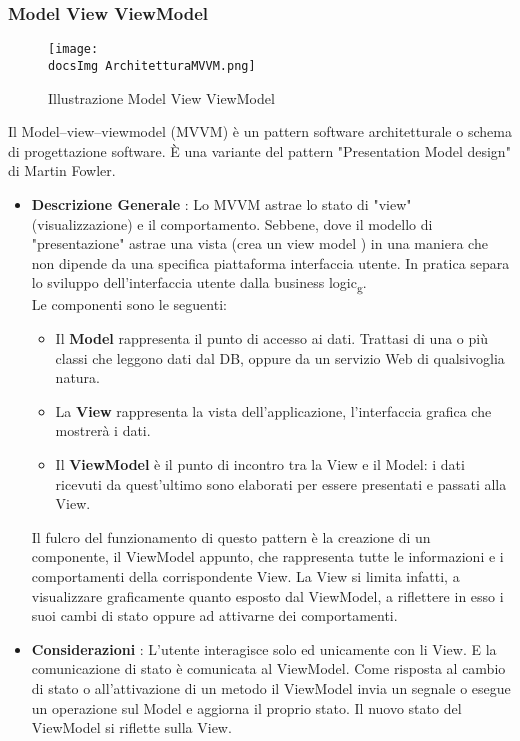{{		\subsubsection{Model View ViewModel}{
			\begin{figure}[ht]
				\centering
				\texttt{[image: \\docsImg ArchitetturaMVVM.png]}
				\caption{Illustrazione Model View ViewModel}
				\label{Illustrazione Model View ViewModel}
			\end{figure}
			Il Model–view–viewmodel (MVVM) è un pattern software architetturale o schema di progettazione software. È una variante del pattern "Presentation Model design" di Martin Fowler.
			\begin{itemize}\itemsep1pt
				\item \textbf{Descrizione Generale} : Lo MVVM astrae lo stato di "view" (visualizzazione) e il comportamento. Sebbene, dove il modello di "presentazione" astrae una vista (crea un view model ) in una maniera che non dipende da una specifica piattaforma interfaccia utente. In pratica separa lo sviluppo dell'interfaccia utente dalla business logic\textsubscript{g}.\\
				Le componenti sono le seguenti:
				\begin{itemize}
					\item Il \textbf{Model} rappresenta il punto di accesso ai dati. Trattasi di una o più classi che leggono dati dal DB, oppure da un servizio Web di qualsivoglia natura.
					\item La \textbf{View} rappresenta la vista dell'applicazione, l'interfaccia grafica che mostrerà i dati.
					\item Il \textbf{ViewModel} è il punto di incontro tra la View e il Model: i dati ricevuti da quest’ultimo sono elaborati per essere presentati e passati alla View.
				\end{itemize}
				Il fulcro del funzionamento di questo pattern è la creazione di un componente, il ViewModel appunto, che rappresenta tutte le informazioni e i comportamenti della corrispondente View. La View si limita infatti, a visualizzare graficamente quanto esposto dal ViewModel, a riflettere in esso i suoi cambi di stato oppure ad attivarne dei comportamenti.
				\item \textbf{Considerazioni} : L'utente interagisce solo ed unicamente con li View. E la comunicazione di stato è comunicata al ViewModel. Come risposta al cambio di stato o all'attivazione di un metodo il ViewModel invia un segnale o esegue un operazione sul Model e aggiorna il proprio stato. Il nuovo stato del ViewModel si riflette sulla View.\\

\end{itemize}}}}
